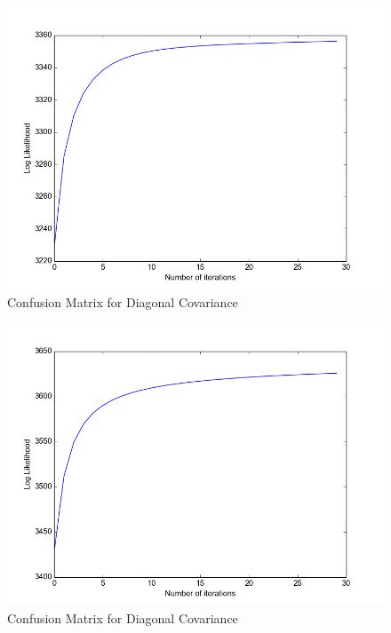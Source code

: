 \documentclass[11pt,a4paper]{article}
\begin{document}
\begin{minipage}[b]{0.5\textwidth}
\begin{figure}[H]
  \centering
  \includegraphics[width=.8\linewidth]{Figures/likelihood_HW2.png}
\caption{Confusion Matrix for Diagonal Covariance}
  \label{fig:sfig1}
\end{figure}%
\end{minipage}
\begin{minipage}[b]{0.5\textwidth}
\begin{figure}[H]
  \centering
  \includegraphics[width=.8\linewidth]{Figures/likelihood_HW3.png}
\caption{Confusion Matrix for Diagonal Covariance}
  \label{fig:sfig1}
\end{figure}%
\end{minipage}
\end{document}
